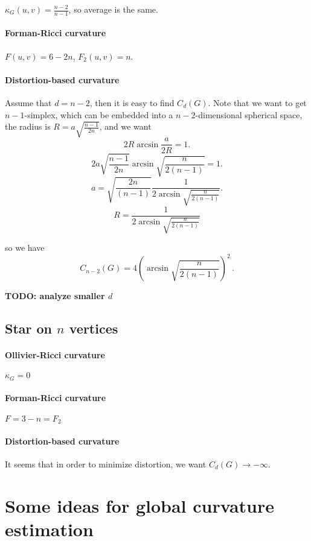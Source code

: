 \documentclass{article}
\begin{document}
$\kappa_G(u,v) = \frac{n-2}{n-1}$, so average is the same.

\paragraph{Forman-Ricci curvature} $F(u,v) = 6 - 2n$, $F_2(u,v) = n$.

\paragraph{Distortion-based curvature} Assume that $d = n-2$, then it is easy to find $C_d(G)$. Note that we want to get $n-1$-simplex, which can be embedded into a $n-2$-dimensional spherical space, the radius is $R = a\sqrt{\frac{n-1}{2n}}$, and we want
\[
2 R \arcsin \frac{a}{2R} = 1.
\]
\[
2 a\sqrt{\frac{n-1}{2n}} \arcsin \sqrt{\frac{n}{2(n-1)}} = 1.
\]
\[
a  = \sqrt{\frac{2n}{(n-1)}}\frac{1}{2\arcsin \sqrt{\frac{n}{2(n-1)}}}.
\]
\[
R = \frac{1}{2\arcsin \sqrt{\frac{n}{2(n-1)}}}
\]

so we have
\[
C_{n-2}(G) = 4 \left(\arcsin \sqrt{\frac{n}{2(n-1)}}\right)^2\,.
\]



\textbf{TODO: analyze smaller $d$}

\subsection{Star on $n$ vertices}

\paragraph{Ollivier-Ricci curvature} $\kappa_G = 0$

\paragraph{Forman-Ricci curvature} $F = 3-n = F_2$

\paragraph{Distortion-based curvature} It seems that in order to minimize distortion, we want $C_d(G) \to -\infty$.
    
\section{Some ideas for global curvature estimation}
\end{document}
